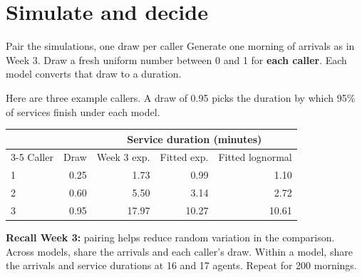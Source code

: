 \documentclass{beamer}
\begin{document}
\section{Simulate and decide}

\begin{frame}{Pair the simulations, one draw per caller}
  \small
  Generate one morning of arrivals as in Week 3. Draw a fresh uniform
  number between 0 and 1 for \textbf{each caller}. Each model converts
  that draw to a duration.

  \vspace{0.5em}
  Here are three example callers. A draw of 0.95 picks the duration
  by which 95\% of services finish under each model.

  \vspace{0.5em}
  \centering
  \begin{tabular}{@{}lrrrr@{}}
    \toprule
    & & \multicolumn{3}{c}{Service duration (minutes)}\\
    \cmidrule(l){3-5}
    Caller & Draw & Week 3 exp. & Fitted exp. & Fitted lognormal\\
    \midrule
    1 & 0.25 & 1.73 & 0.99 & 1.10\\
    2 & 0.60 & 5.50 & 3.14 & 2.72\\
    3 & 0.95 & 17.97 & 10.27 & 10.61\\
    \bottomrule
  \end{tabular}

  \vspace{0.6em}
  \raggedright
  \textbf{Recall Week 3:} pairing helps reduce random variation in the
  comparison. Across models, share the arrivals and each caller's draw.
  Within a model, share the arrivals and service durations at 16 and
  17 agents. Repeat for 200 mornings.
\end{frame}
\end{document}

